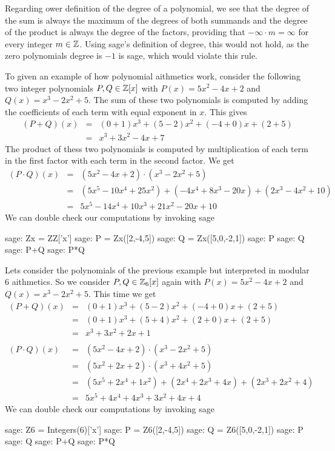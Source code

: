 Regarding ower definition of the degree of a polynomial, we see that the degree of the sum is always the maximum of the degrees of both summands and the degree of the product is always the degree of the factors, providing that $-\infty \cdot m= \infty$ for every integer $m\in\mathbb{Z}$. Using sage's definition of degree, this would not hold, as the zero polynomials degree is $-1$ is sage, which would violate this rule.
\begin{example} To given an example of how polynomial aithmetics work, consider the following two integer polynomials $P,Q\in \mathbb{Z}[x]$ with $P(x)= 5x^2 -4x +2$ and $Q(x)=x^3-2x^2 +5$. The sum of these two polynomials is computed by adding the coefficients of each term with equal exponent in $x$. This gives
$$
\begin{array}{lcl}
(P+Q)(x) & = & (0+1)x^3 + (5-2)x^2 + (-4 +0) x +(2+5) \\
         & = & x^3 +3x^2 -4x +7
\end{array}
$$
The product of thess two polynomials is computed by multiplication of each term in the first factor with each term in the second factor. We get
$$
\begin{array}{lcl}
(P\cdot Q)(x) & = & (5x^2 -4x +2)\cdot (x^3-2x^2 +5) \\
              & = & (5 x^5 -10 x^4 +25 x^2)+ (-4x^4 +8 x^3 -20x) + (2x^3 -4x^2+10) \\
              & = & 5 x^5 -14x^4 +10x^3+21x^2-20x +10
\end{array}
$$
We can double check our computations by invoking sage
\begin{sagecommandline}
sage: Zx = ZZ['x'] 
sage: P = Zx([2,-4,5])
sage: Q = Zx([5,0,-2,1])
sage: P
sage: Q
sage: P+Q
sage: P*Q
\end{sagecommandline}
\end{example}
\begin{example} Lets consider the polynomials of the previous example but interpreted in modular $6$ aithmetics. So we consider $P,Q\in \mathbb{Z}_6[x]$ again with $P(x)= 5x^2 -4x +2$ and $Q(x)=x^3-2x^2 +5$. This time we get
$$
\begin{array}{lcl}
(P+Q)(x) & = & (0+1)x^3 + (5-2)x^2 + (-4 +0) x +(2+5) \\
         & = & (0+1)x^3 + (5+4)x^2 + (2 +0) x +(2+5) \\
         & = & x^3 +3x^2 +2x +1\\
         \\
(P\cdot Q)(x) & = & (5x^2 -4x +2)\cdot (x^3-2x^2 +5) \\
              & = & (5x^2 +2x +2)\cdot (x^3+4x^2 +5) \\
              & = & (5 x^5 +2 x^4 +1x^2)+ (2x^4 +2x^3 +4x) + (2x^3 +2x^2+4) \\
              & = & 5 x^5 +4x^4 +4x^3+3x^2+4x +4
\end{array}
$$
We can double check our computations by invoking sage
\begin{sagecommandline}
sage: Z6 = Integers(6)['x'] 
sage: P = Z6([2,-4,5])
sage: Q = Z6([5,0,-2,1])
sage: P
sage: Q
sage: P+Q
sage: P*Q
\end{sagecommandline}
\end{example}

